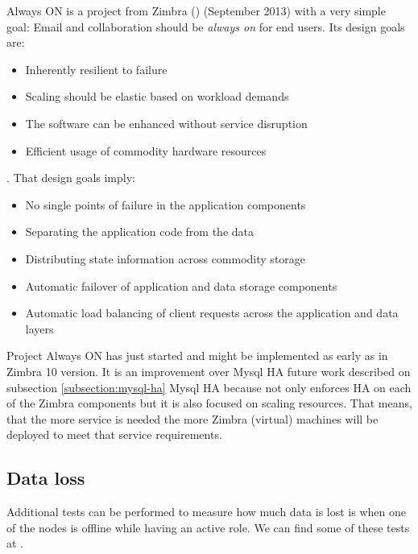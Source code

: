 Always ON is a project from Zimbra (\cite{ZimbraProjectAlwaysOn}) (September 2013) with a very simple goal: Email and collaboration should be \textit{always on} for end users. Its design goals are:
\begin{itemize}
  \item Inherently resilient to failure
  \item Scaling should be elastic based on workload demands
  \item The software can be enhanced without service disruption
  \item Efficient usage of commodity hardware resources
\end{itemize}
. That design goals imply:
\begin{itemize}
  \item No single points of failure in the application components
  \item Separating the application code from the data
  \item Distributing state information across commodity storage
  \item Automatic failover of application and data storage components
  \item Automatic load balancing of client requests across the application and data layers
\end{itemize}

Project Always ON has just started and might be implemented as early as in Zimbra 10 version. It is an improvement over Mysql HA future work described on subsection {\ref{subsection:mysql-ha} Mysql HA} because not only enforces HA on each of the Zimbra components but it is also focused on scaling resources. That means, that the more service is needed the more Zimbra (virtual) machines will be deployed to meet that service requirements.

\subsection {Data loss}
Additional tests can be performed to measure how much data is lost is when one of the nodes is offline while having an active role. We can find some of these tests at \cite{TaerHowtoHAZimbra8}.
